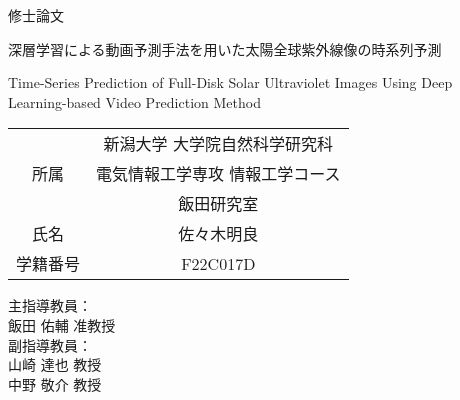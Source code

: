 \thispagestyle{empty} %

\begin{center}

    \vspace{2cm}
    
    {\Huge 修士論文}
    
    \vspace{2cm}
    
    {\LARGE 深層学習による動画予測手法を用いた太陽全球紫外線像の時系列予測}
    
    \vspace{1cm}
    
    {\Large Time-Series Prediction of Full-Disk Solar Ultraviolet Images Using Deep Learning-based Video Prediction Method}
    
    \vspace{1cm}
    
    \Large
    \begin{tabular}{|c|c|}
      \hline
      \multirow{3}{*}{所属} & 新潟大学 大学院自然科学研究科\\ &  電気情報工学専攻 情報工学コース \\ & 飯田研究室 \\
      \hline
      氏名 &  佐々木明良\\
      \hline
      学籍番号 & F22C017D\\
      \hline
    \end{tabular}
\end{center}

\vspace{2cm}

\begin{flushright}
  \begin{Large}
    主指導教員：　　　\\
    飯田 佑輔 准教授\\
    副指導教員：　　　\\
    山崎 達也 教授\\
    中野 敬介 教授
  \end{Large}
\end{flushright}

\clearpage %

